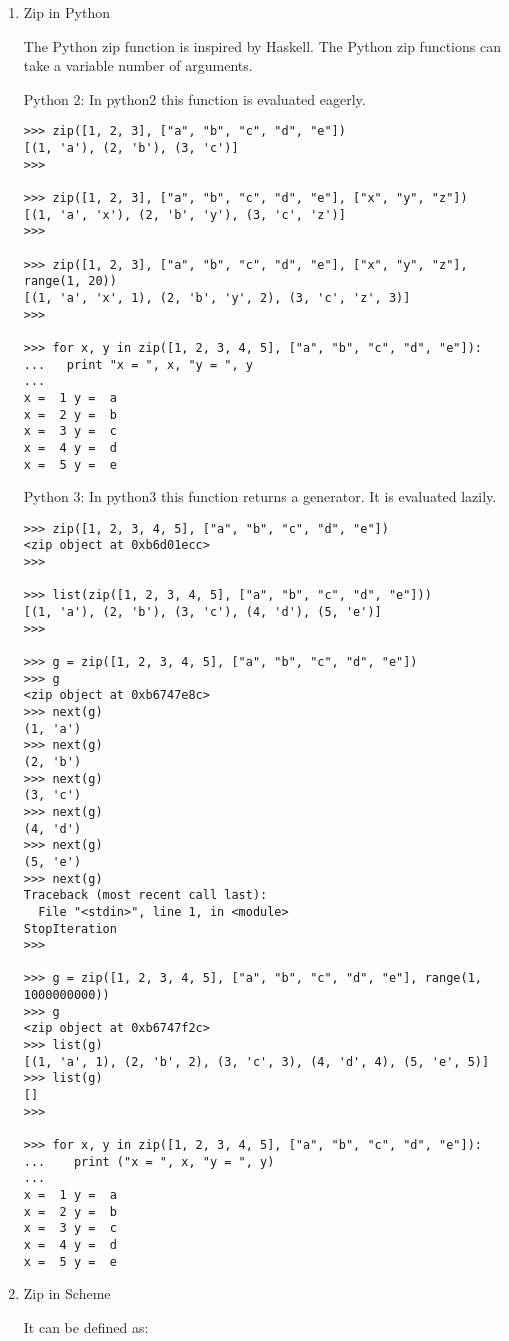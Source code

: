 \documentclass[11pt]{article}
\begin{document}
\begin{enumerate}
\item Zip in Python
\label{sec-1-10-4-3}

The Python zip function is inspired by Haskell. The Python zip
functions can take a variable number of arguments.


Python 2: In python2 this function is evaluated eagerly. 

\begin{verbatim}
>>> zip([1, 2, 3], ["a", "b", "c", "d", "e"])
[(1, 'a'), (2, 'b'), (3, 'c')]
>>>

>>> zip([1, 2, 3], ["a", "b", "c", "d", "e"], ["x", "y", "z"])
[(1, 'a', 'x'), (2, 'b', 'y'), (3, 'c', 'z')]
>>>

>>> zip([1, 2, 3], ["a", "b", "c", "d", "e"], ["x", "y", "z"], range(1, 20))
[(1, 'a', 'x', 1), (2, 'b', 'y', 2), (3, 'c', 'z', 3)]
>>> 

>>> for x, y in zip([1, 2, 3, 4, 5], ["a", "b", "c", "d", "e"]):
...   print "x = ", x, "y = ", y
... 
x =  1 y =  a
x =  2 y =  b
x =  3 y =  c
x =  4 y =  d
x =  5 y =  e
\end{verbatim}

Python 3: In python3 this function returns a generator. It is evaluated lazily.

\begin{verbatim}
>>> zip([1, 2, 3, 4, 5], ["a", "b", "c", "d", "e"])
<zip object at 0xb6d01ecc>
>>> 

>>> list(zip([1, 2, 3, 4, 5], ["a", "b", "c", "d", "e"]))
[(1, 'a'), (2, 'b'), (3, 'c'), (4, 'd'), (5, 'e')]
>>> 

>>> g = zip([1, 2, 3, 4, 5], ["a", "b", "c", "d", "e"])
>>> g
<zip object at 0xb6747e8c>
>>> next(g)
(1, 'a')
>>> next(g)
(2, 'b')
>>> next(g)
(3, 'c')
>>> next(g)
(4, 'd')
>>> next(g)
(5, 'e')
>>> next(g)
Traceback (most recent call last):
  File "<stdin>", line 1, in <module>
StopIteration
>>> 

>>> g = zip([1, 2, 3, 4, 5], ["a", "b", "c", "d", "e"], range(1, 1000000000))
>>> g
<zip object at 0xb6747f2c>
>>> list(g)
[(1, 'a', 1), (2, 'b', 2), (3, 'c', 3), (4, 'd', 4), (5, 'e', 5)]
>>> list(g)
[]
>>> 

>>> for x, y in zip([1, 2, 3, 4, 5], ["a", "b", "c", "d", "e"]):
...    print ("x = ", x, "y = ", y)
... 
x =  1 y =  a
x =  2 y =  b
x =  3 y =  c
x =  4 y =  d
x =  5 y =  e
\end{verbatim}

\item Zip in Scheme
\label{sec-1-10-4-4}

It can be defined as:


\end{enumerate}
\end{document}
